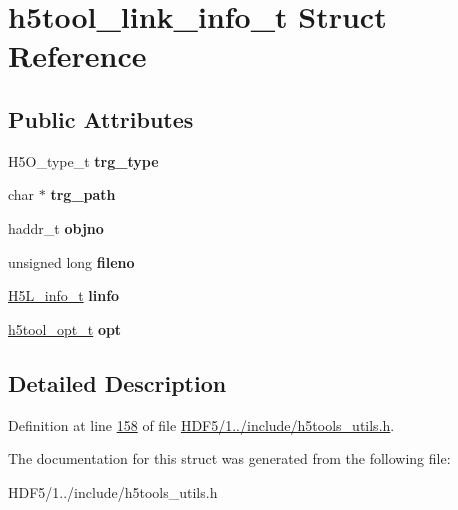 \hypertarget{structh5tool__link__info__t}{}\section{h5tool\+\_\+link\+\_\+info\+\_\+t Struct Reference}
\label{structh5tool__link__info__t}
\subsection*{Public Attributes}
\begin{DoxyCompactItemize}
\item 
\mbox{\label{structh5tool__link__info__t_ab8d95dc9e6648860aae39a4377708d21}} 
H5\+O\+\_\+type\+\_\+t {\bfseries trg\+\_\+type}
\item 
\mbox{\label{structh5tool__link__info__t_a546ce512ceeb51e4f6323e9480c2a168}} 
char $\ast$ {\bfseries trg\+\_\+path}
\item 
\mbox{\label{structh5tool__link__info__t_ae5ff84fea5acafe6779b3852bba4a6a1}} 
haddr\+\_\+t {\bfseries objno}
\item 
\mbox{\label{structh5tool__link__info__t_afdbdd84b67d20a0d52f1f849c6a40ebd}} 
unsigned long {\bfseries fileno}
\item 
\mbox{\label{structh5tool__link__info__t_a747f546bab64af1182cca78f7462bd66}} 
\hyperlink{struct_h5_l__info__t}{H5\+L\+\_\+info\+\_\+t} {\bfseries linfo}
\item 
\mbox{\label{structh5tool__link__info__t_a6b58c28ddbf5ace8f02f52212481b6bc}} 
\hyperlink{structh5tool__opt__t}{h5tool\+\_\+opt\+\_\+t} {\bfseries opt}
\end{DoxyCompactItemize}


\subsection{Detailed Description}


Definition at line \hyperlink{_h_d_f5_21_810_81_2include_2h5tools__utils_8h_source_l00158}{158} of file \hyperlink{_h_d_f5_21_810_81_2include_2h5tools__utils_8h_source}{H\+D\+F5/1../include/h5tools\+\_\+utils.\+h}.



The documentation for this struct was generated from the following file\+:\begin{DoxyCompactItemize}
\item 
H\+D\+F5/1../include/h5tools\+\_\+utils.\+h\end{DoxyCompactItemize}
